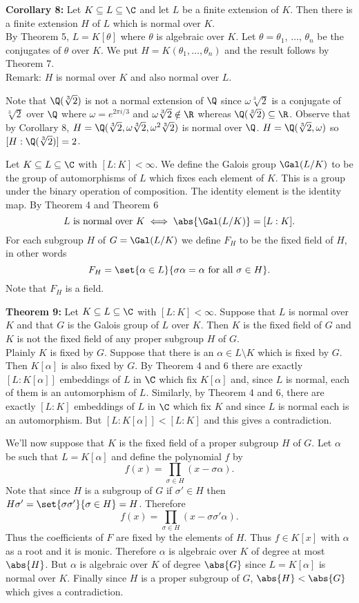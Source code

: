 \textbf{Corollary 8:} Let $K\subseteq L\subseteq\C$ and let $L$ be a finite extension of $K$.  Then there is a finite extension $H$ of $L$ which is normal over $K$. \\
\pf By Theorem 5, $L=K[\theta]$ where $\theta$ is algebraic over $K$.  Let $\theta=\theta_1$, $\dotsc$, $\theta_n$ be the conjugates of $\theta$ over $K$.  We put $H=K(\theta_1,\dotsc,\theta_n)$ and the result follows by Theorem 7. \\
Remark: $H$ is normal over $K$ and also normal over $L$.

Note that $\Q(\sqrt[3]{2})$ is not a normal extension of $\Q$ since $\omega\sqrt[3]{2}$ is a conjugate of $\sqrt[3]{2}$ over $\Q$ where $\omega=e^{2\pi i/3}$ and $\omega\sqrt[3]{2}\notin\R$ whereas $\Q(\sqrt[3]{2})\subseteq\R$.  Observe that by Corollary 8, $H=\Q(\sqrt[3]{2},\omega\sqrt[3]{2},\omega^2\sqrt[3]{2})$ is normal over $\Q$.  $H=\Q(\sqrt[3]{2},\omega)$ so $[H:\Q(\sqrt[3]{2})]=2$.

Let $K\subseteq L\subseteq\C$ with $[L:K]<\infty$.  We define the Galois group $\Gal(L/K)$ to be the group of automorphisms of $L$ which fixes each element of $K$.  This is a group under the binary operation of composition.  The identity element is the identity map.  By Theorem 4 and Theorem 6
\[ \text{$L$ is normal over $K$} \iff \abs{\Gal(L/K)} = [L:K] . \]
For each subgroup $H$ of $G=\Gal(L/K)$ we define $F_H$ to be the fixed field of $H$, in other words
\[ F_H = \set{\alpha\in L}{\sigma\alpha=\alpha\text{ for all }\sigma\in H} . \]
Note that $F_H$ is a field.

\textbf{Theorem 9:} Let $K\subseteq L\subseteq\C$ with $[L:K]<\infty$.  Suppose that $L$ is normal over $K$ and that $G$ is the Galois group of $L$ over $K$.  Then $K$ is the fixed field of $G$ and $K$ is not the fixed field of any proper subgroup $H$ of $G$. \\
\pf Plainly $K$ is fixed by $G$.  Suppose that there is an $\alpha\in L\setminus K$ which is fixed by $G$.  Then $K[\alpha]$ is also fixed by $G$.  By Theorem 4 and 6 there are exactly $[L:K[\alpha]]$ embeddings of $L$ in $\C$ which fix $K[\alpha]$ and, since $L$ is normal, each of them is an automorphism of $L$.  Similarly, by Theorem 4 and 6, there are exactly $[L:K]$ embeddings of $L$ in $\C$ which fix $K$ and since $L$ is normal each is an automorphism.  But $[L:K[\alpha]]<[L:K]$ and this gives a contradiction.

We'll now suppose that $K$ is the fixed field of a proper subgroup $H$ of $G$.  Let $\alpha$ be such that $L=K[\alpha]$ and define the polynomial $f$ by
\[ f(x) = \prod_{\sigma\in H}(x-\sigma\alpha) . \]
Note that since $H$ is a subgroup of $G$ if $\sigma'\in H$ then $H\sigma'=\set{\sigma\sigma'}{\sigma\in H}=H$.  Therefore
\[ f(x) = \prod_{\sigma\in H}(x-\sigma\sigma'\alpha) . \]
Thus the coefficients of $F$ are fixed by the elements of $H$.  Thus $f\in K[x]$ with $\alpha$ as a root and it is monic.  Therefore $\alpha$ is algebraic over $K$ of degree at most $\abs{H}$.  But $\alpha$ is algebraic over $K$ of degree $\abs{G}$ since $L=K[\alpha]$ is normal over $K$.  Finally since $H$ is a proper subgroup of $G$, $\abs{H}<\abs{G}$ which gives a contradiction.

